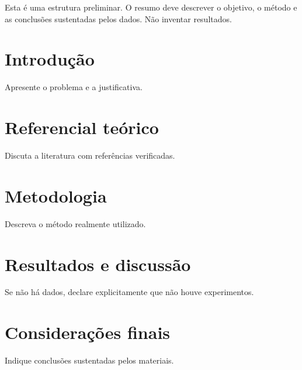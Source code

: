 \documentclass[article,12pt,oneside,a4paper,brazil]{abntex2}
\begin{document}
\maketitle
\begin{resumo}
Esta é uma estrutura preliminar. O resumo deve descrever o objetivo,
o método e as conclusões sustentadas pelos dados. Não inventar resultados.
\end{resumo}
\textual
\section{Introdução}
\label{sec:intro}
Apresente o problema e a justificativa.
\section{Referencial teórico}
\label{sec:related_work}
Discuta a literatura com referências verificadas.
\section{Metodologia}
\label{sec:method}
Descreva o método realmente utilizado.
\section{Resultados e discussão}
\label{sec:experiments}
Se não há dados, declare explicitamente que não houve experimentos.
\section{Considerações finais}
\label{sec:conclusion}
Indique conclusões sustentadas pelos materiais.
\postextual

\end{document}
